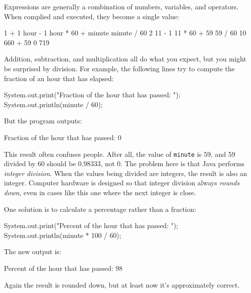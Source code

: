 \documentclass[12pt]{book}
\theoremstyle{exercise}
\newcommand{\java}[1]{\lstinline{#1}} %
\begin{document}
Expressions are generally a combination of numbers, variables, and operators.
When complied and executed, they become a single value:

\begin{code}
    1 + 1     hour - 1     hour * 60 + minute     minute / 60
    2         11 - 1       11 * 60 + 59           59 / 60
              10           660 + 59               0
                           719
\end{code}

Addition, subtraction, and multiplication all do what you expect, but you might be surprised by division.
For example, the following lines try to compute the fraction of an hour that has elapsed:

\begin{code}
    System.out.print("Fraction of the hour that has passed: ");
    System.out.println(minute / 60);
\end{code}

But the program outputs:

\begin{stdout}
Fraction of the hour that has passed: 0
\end{stdout}


This result often confuses people.
After all, the value of \java{minute} is 59, and 59 divided by 60 should be 0.98333, not 0.
The problem here is that Java performs {\em integer division}.
When the values being divided are integers, the result is also an integer.
Computer hardware is designed so that integer division always {\em rounds down}, even in cases like this one where the next integer is close.

One solution is to calculate a percentage rather than a fraction:

\begin{code}
    System.out.print("Percent of the hour that has passed: ");
    System.out.println(minute * 100 / 60);
\end{code}

The new output is:

\begin{stdout}
Percent of the hour that has passed: 98
\end{stdout}

Again the result is rounded down, but at least now it's approximately correct.
\end{document}

